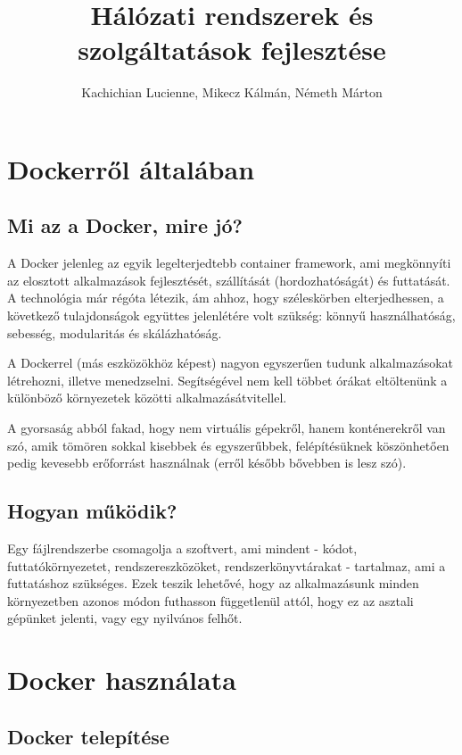 \documentclass[]{article}
\title{Hálózati rendszerek és szolgáltatások fejlesztése}
\author{Kachichian Lucienne, Mikecz Kálmán, Németh Márton}
\numberwithin{equation}{section}
\begin{document}
\maketitle

\section{Dockerről általában}

\subsection{Mi az a Docker, mire jó?}

A Docker jelenleg az egyik legelterjedtebb container framework, ami megkönnyíti az elosztott alkalmazások fejlesztését, szállítását (hordozhatóságát) és futtatását. A technológia már régóta létezik, ám ahhoz, hogy széleskörben elterjedhessen, a következő tulajdonságok együttes jelenlétére volt szükség: könnyű használhatóság, sebesség, modularitás és skálázhatóság.

A Dockerrel (más eszközökhöz képest) nagyon egyszerűen tudunk alkalmazásokat létrehozni, illetve menedzselni. Segítségével nem kell többet órákat eltöltenünk a különböző környezetek közötti alkalmazásátvitellel.

A gyorsaság abból fakad, hogy nem virtuális gépekről, hanem konténerekről van szó, amik tömören sokkal kisebbek és egyszerűbbek, felépítésüknek köszönhetően pedig kevesebb erőforrást használnak (erről később bővebben is lesz szó).

\subsection{Hogyan működik?}


Egy fájlrendszerbe csomagolja a szoftvert, ami mindent - kódot, futtatókörnyezetet, rendszereszközöket, rendszerkönyvtárakat - tartalmaz, ami a futtatáshoz szükséges. Ezek teszik lehetővé, hogy az alkalmazásunk minden környezetben azonos módon futhasson függetlenül attól, hogy ez az asztali gépünket jelenti, vagy egy nyilvános felhőt. 

\section{Docker használata}

\subsection{Docker telepítése}
\end{document}
